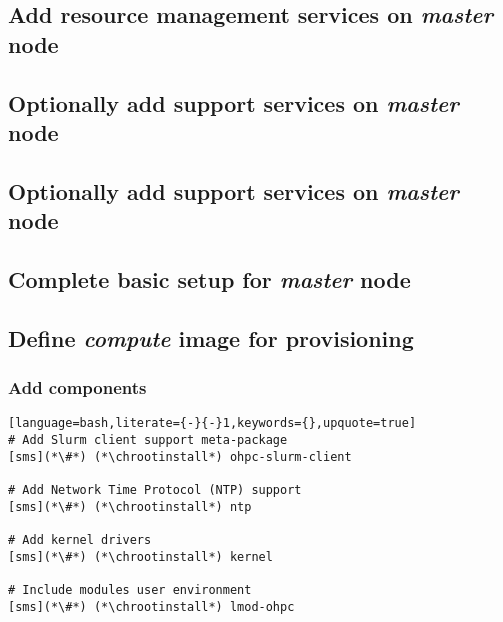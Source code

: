 \documentclass[letterpaper]{article}
\newcommand{\chrootinstall}{yum -y --installroot=\$CHROOT install}
\begin{document}
\subsection{Add resource management services on {\em master} node} \label{sec:add_rm}


\subsection{Optionally add \InfiniBand{} support services on {\em master} node} \label{sec:add_ofed}


\subsection{Optionally add \OmniPath{} support services on {\em master} node} \label{sec:add_opa}


\subsection{Complete basic \xCAT{} setup for {\em master} node} \label{sec:setup_xcat}



\clearpage
\subsection{Define {\em compute} image for provisioning}



\subsubsection{Add \OHPC{} components} \label{sec:add_components}


\begin{lstlisting}[language=bash,literate={-}{-}1,keywords={},upquote=true]
# Add Slurm client support meta-package
[sms](*\#*) (*\chrootinstall*) ohpc-slurm-client

# Add Network Time Protocol (NTP) support
[sms](*\#*) (*\chrootinstall*) ntp

# Add kernel drivers
[sms](*\#*) (*\chrootinstall*) kernel

# Include modules user environment
[sms](*\#*) (*\chrootinstall*) lmod-ohpc
\end{lstlisting}
\end{document}
